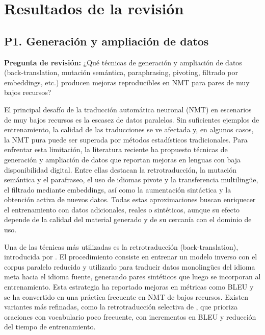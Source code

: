 \documentclass[12pt,a4paper,oneside]{book}
\begin{document}
\section{Resultados de la revisión}\label{resultados-de-la-revisiuxf3n}

\subsection{P1. Generación y ampliación de datos}\label{quuxe9-tuxe9cnicas-de-generaciuxf3n-y-ampliaciuxf3n-de-datos-back-translation-mutaciuxf3n-semuxe1ntica-paraphrasing-pivoting-filtrado-por-embeddings-etc.-producen-mejoras-reproducibles-en-nmt-para-pares-de-muy-bajos-recursos}

\noindent\textbf{Pregunta de revisión:} ¿Qué técnicas de generación y ampliación de datos (back-translation, mutación semántica, paraphrasing, pivoting, filtrado por embeddings, etc.) producen mejoras reproducibles en NMT para pares de muy bajos recursos?

El principal desafío de la traducción automática neuronal (NMT) en escenarios de muy bajos recursos es la escasez de datos paralelos. Sin suficientes ejemplos de entrenamiento, la calidad de las traducciones se ve afectada y, en algunos casos, la NMT pura puede ser superada por métodos estadísticos tradicionales. Para enfrentar esta limitación, la literatura reciente ha propuesto técnicas de generación y ampliación de datos que reportan mejoras en lenguas con baja disponibilidad digital. Entre ellas destacan la retrotraducción, la mutación semántica y el parafraseo, el uso de idiomas pivote y la transferencia multilingüe, el filtrado mediante embeddings, así como la aumentación sintáctica y la obtención activa de nuevos datos. Todas estas aproximaciones buscan enriquecer el entrenamiento con datos adicionales, reales o sintéticos, aunque su efecto depende de la calidad del material generado y de su cercanía con el dominio de uso.

Una de las técnicas más utilizadas es la retrotraducción (back-translation), introducida por \textcite{sennrich2016bt}. El procedimiento consiste en entrenar un modelo inverso con el corpus paralelo reducido y utilizarlo para traducir datos monolingües del idioma meta hacia el idioma fuente, generando pares sintéticos que luego se incorporan al entrenamiento. Esta estrategia ha reportado mejoras en métricas como BLEU y se ha convertido en una práctica frecuente en NMT de bajos recursos. Existen variantes más refinadas, como la retrotraducción selectiva de \textcite{luo2019}, que prioriza oraciones con vocabulario poco frecuente, con incrementos en BLEU y reducción del tiempo de entrenamiento.
\end{document}
